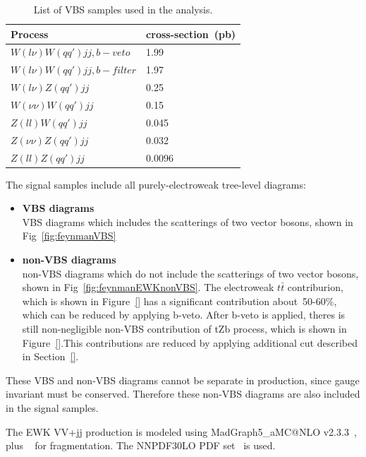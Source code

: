 \begin{table}[!htbp]
\begin{center}
\small
\begin{tabular}{|l|l|}
\hline
Process & cross-section~(pb) \\
\hline
$W(l\nu)W(qq\prime)jj,b-veto$     & 1.99    \\
$W(l\nu)W(qq\prime)jj,b-filter$   &  1.97   \\
$W(l\nu)Z(qq\prime)jj$            &  0.25   \\
$W(\nu\nu)W(qq\prime)jj$          &  0.15   \\
$Z(ll)W(qq\prime)jj$              &  0.045  \\
$Z(\nu\nu)Z(qq\prime)jj$          &  0.032  \\
$Z(ll)Z(qq\prime)jj$              &  0.0096 \\
\hline
\end{tabular}
\caption{List of VBS samples used in the analysis.
}
\label{tab:VBS_sig_samples}
\end{center}
\end{table}

The signal samples include all purely-electroweak tree-level diagrams:
\begin{itemize}
    \item \textbf{VBS diagrams} 
    \\ VBS diagrams which includes the scatterings of two vector bosons, shown in Fig~\ref{fig:feynmanVBS}
    \item \textbf{non-VBS diagrams} 
    \\ non-VBS diagrams which do not include the scatterings of two vector bosons, shown in Fig~\ref{fig:feynmanEWKnonVBS}. The electroweak $t\bar{t}$ contriburion, which is shown in Figure~\ref{} has a significant contribution about~50-60\%, which can be reduced by applying b-veto. After b-veto is applied, theres is still non-negligible non-VBS contribution of tZb process, which is shown in Figure~\ref{}.This contributions are reduced by applying additional cut described in Section~\ref{}.
\end{itemize}

These VBS and non-VBS diagrams cannot be separate in production, since gauge invariant must be conserved. Therefore these non-VBS diagrams are also included in the signal samples.

The EWK VV+jj production is modeled using MadGraph5\_aMC@NLO v2.3.3~\cite{Alwall:2014hca},
plus ~\cite{Sjostrand:2007gs} for fragmentation.
The \textsc{NNPDF30LO} PDF set~\cite{Ball:2012cx} is used.

